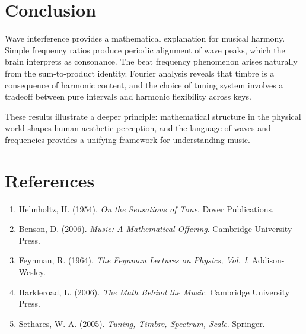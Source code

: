 \documentclass[11pt]{article}
\theoremstyle{definition}
\begin{document}
\section{Conclusion}

Wave interference provides a mathematical explanation for musical harmony. Simple frequency ratios produce periodic alignment of wave peaks, which the brain interprets as consonance. The beat frequency phenomenon arises naturally from the sum-to-product identity. Fourier analysis reveals that timbre is a consequence of harmonic content, and the choice of tuning system involves a tradeoff between pure intervals and harmonic flexibility across keys.

These results illustrate a deeper principle: mathematical structure in the physical world shapes human aesthetic perception, and the language of waves and frequencies provides a unifying framework for understanding music.

\section*{References}

\begin{enumerate}
    \item Helmholtz, H. (1954). \emph{On the Sensations of Tone}. Dover Publications.
    \item Benson, D. (2006). \emph{Music: A Mathematical Offering}. Cambridge University Press.
    \item Feynman, R. (1964). \emph{The Feynman Lectures on Physics, Vol. I}. Addison-Wesley.
    \item Harkleroad, L. (2006). \emph{The Math Behind the Music}. Cambridge University Press.
    \item Sethares, W. A. (2005). \emph{Tuning, Timbre, Spectrum, Scale}. Springer.
\end{enumerate}
\end{document}
